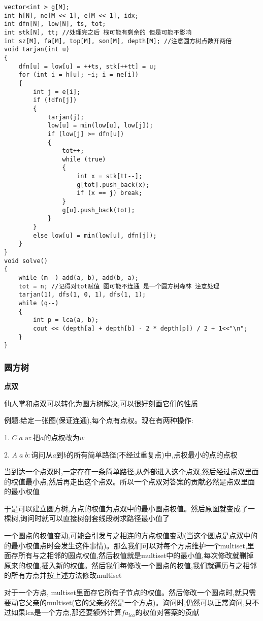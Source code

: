 \documentclass[a4paper, fontset=none]{ctexart}
\begin{document}
\begin{verbatim}
vector<int > g[M];
int h[N], ne[M << 1], e[M << 1], idx;
int dfn[N], low[N], ts, tot;
int stk[N], tt; //处理完之后 栈可能有剩余的 但是可能不影响
int sz[M], fa[M], top[M], son[M], depth[M]; //注意圆方树点数开两倍
void tarjan(int u)
{
    dfn[u] = low[u] = ++ts, stk[++tt] = u;
    for (int i = h[u]; ~i; i = ne[i])
    {
        int j = e[i];
        if (!dfn[j])
        {
            tarjan(j);
            low[u] = min(low[u], low[j]);
            if (low[j] >= dfn[u])
            {
                tot++;
                while (true)
                {
                    int x = stk[tt--];
                    g[tot].push_back(x);
                    if (x == j) break;
                }
                g[u].push_back(tot);
            }
        }
        else low[u] = min(low[u], dfn[j]);
    }
}
void solve()
{
    while (m--) add(a, b), add(b, a);
    tot = n; //记得对tot赋值 图可能不连通 是一个圆方树森林 注意处理
    tarjan(1), dfs(1, 0, 1), dfs(1, 1);
    while (q--)
    {
        int p = lca(a, b);
        cout << (depth[a] + depth[b] - 2 * depth[p]) / 2 + 1<<"\n";
    }
}
\end{verbatim}
\subsubsection{圆方树}

\textbf{点双}

仙人掌和点双可以转化为圆方树解决,可以很好刻画它们的性质

例题:给定一张图(保证连通),每个点有点权。现在有两种操作:

1. $C\;a\;w:$把$a$的点权改为$w$

2. $A\;a\;b:$询问从$a$到$b$的所有简单路径(不经过重复点)中,点权最小的点的点权

当到达一个点双时,一定存在一条简单路径,从外部进入这个点双,然后经过点双里面的权值最小点,然后再走出这个点双。所以一个点双对答案的贡献必然是点双里面的最小权值

于是可以建立圆方树,方点的权值为点双中的最小圆点权值。然后原图就变成了一棵树,询问时就可以直接树剖套线段树求路径最小值了

一个圆点的权值变动,可能会引发与之相连的方点权值变动(当这个圆点是点双中的的最小权值点时会发生这件事情)。那么我们可以对每个方点维护一个multiset,里面存所有与之相邻的圆点权值,然后权值就是multiset中的最小值,每次修改就删掉原来的权值,插入新的权值。然后我们每修改一个圆点的权值,我们就遍历与之相邻的所有方点并按上述方法修改multiset

对于一个方点, multiset里面存它所有子节点的权值。然后修改一个圆点时,就只需要动它父亲的multiset(它的父亲必然是一个方点)。询问时,仍然可以正常询问,只不过如果lca是一个方点,那还要额外计算$fa_{lca}$的权值对答案的贡献
\end{document}
